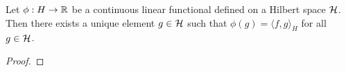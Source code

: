\begin{theorem}
    \cite{small1994hilbert} %
    Let \(\phi : H \to \mathbb{R}\) be a continuous linear functional defined on a Hilbert space \(\mathcal{H}\).
    Then there exists a unique element \(g \in \mathcal{H}\) such that \(\phi(g) = \langle f, g \rangle_H\) for all \(g \in \mathcal{H}\).
\end{theorem}

\begin{proof}
    
\end{proof}

